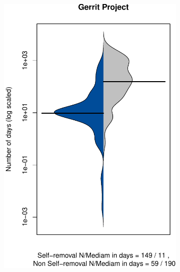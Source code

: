 \begin{figure}[t]
\begin{subfigure}[b]{0.195\textwidth}
		\label{fig:removal_comparison_camel}
	\end{subfigure}
	\begin{subfigure}[b]{0.193\textwidth}
		\includegraphics[width=\textwidth]{figures/test/Gerrit.pdf}
		\label{fig:removal_comparison_gerrit} 
	\end{subfigure}
	\begin{subfigure}[b]{0.195\textwidth}

\end{subfigure}
\end{figure}
